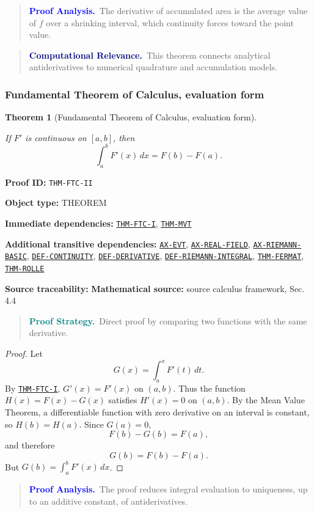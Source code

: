 \documentclass[10pt]{article}
\newcommand{\pidraw}[1]{\begingroup\urlstyle{tt}\nolinkurl{#1}\endgroup}
\newcommand{\pidref}[1]{\hyperref[prf:#1]{\pidraw{#1}}}
\newcommand{\pid}[1]{\pidref{#1}}
\newtheorem{theorem}{Theorem}[section]
\theoremstyle{definition}
\theoremstyle{remark}
\newenvironment{proofstrategy}
{\begin{quote}\small\noindent\textbf{\textcolor{teal}{Proof Strategy.}}\ }
{\end{quote}}
\newenvironment{proofanalysis}
{\begin{quote}\small\noindent\textbf{\textcolor{blue}{Proof Analysis.}}\ }
{\end{quote}}
\newenvironment{computationalrelevance}
{\begin{quote}\small\noindent\textbf{\textcolor{navy}{Computational Relevance.}}\ }
{\end{quote}}
\newcommand{\meta}[2]{\noindent\textbf{#1:} #2\par}
\begin{document}
\begin{proofanalysis}The derivative of accumulated area is the average value of $f$ over a shrinking interval, which continuity forces toward the point value.\end{proofanalysis}

\begin{computationalrelevance}This theorem connects analytical antiderivatives to numerical quadrature and accumulation models.\end{computationalrelevance}

\subsubsection{Fundamental Theorem of Calculus, evaluation form}

\begin{theorem}[Fundamental Theorem of Calculus, evaluation form]\label{prf:THM-FTC-II}

If $F'$ is continuous on $[a,b]$, then
\[
\int_a^b F'(x)\,dx=F(b)-F(a).
\]

\end{theorem}

\meta{Proof ID}{\pidraw{THM-FTC-II}}
\meta{Object type}{THEOREM}
\meta{Immediate dependencies}{\pidref{THM-FTC-I}, \pidref{THM-MVT}}
\meta{Additional transitive dependencies}{\pidref{AX-EVT}, \pidref{AX-REAL-FIELD}, \pidref{AX-RIEMANN-BASIC}, \pidref{DEF-CONTINUITY}, \pidref{DEF-DERIVATIVE}, \pidref{DEF-RIEMANN-INTEGRAL}, \pidref{THM-FERMAT}, \pidref{THM-ROLLE}}
\meta{Source traceability}{\textbf{Mathematical source:} source calculus framework, Sec. 4.4}

\begin{proofstrategy}Direct proof by comparing two functions with the same derivative.\end{proofstrategy}

\begin{proof}

Let
\[
G(x)=\int_a^x F'(t)\,dt.
\]
By \pid{THM-FTC-I}, $G'(x)=F'(x)$ on $(a,b)$. Thus the function
$H(x)=F(x)-G(x)$ satisfies $H'(x)=0$ on $(a,b)$. By the Mean Value Theorem,
a differentiable function with zero derivative on an interval is constant, so
$H(b)=H(a)$. Since $G(a)=0$,
\[
F(b)-G(b)=F(a),
\]
and therefore
\[
G(b)=F(b)-F(a).
\]
But $G(b)=\int_a^b F'(x)\,dx$.

\end{proof}

\begin{proofanalysis}The proof reduces integral evaluation to uniqueness, up to an additive constant, of antiderivatives.\end{proofanalysis}
\end{document}
